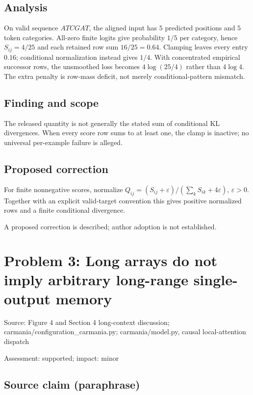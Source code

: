 \documentclass[11pt]{article}
\begin{document}
\subsection*{Analysis}

On valid sequence \(ATCGAT\), the aligned input has \(5\) predicted positions and \(5\) token categories. All-zero finite logits give probability \(1/5\) per category, hence \(S_{ij}=4/25\) and each retained row sum \(16/25=0.64\). Clamping leaves every entry \(0.16\); conditional normalization instead gives \(1/4\). With concentrated empirical successor rows, the unsmoothed loss becomes \(4\log(25/4)\) rather than \(4\log4\). The extra penalty is row-mass deficit, not merely conditional-pattern mismatch.

\subsection*{Finding and scope}

The released quantity is not generally the stated sum of conditional KL divergences. When every score row sums to at least one, the clamp is inactive; no universal per-example failure is alleged.

\subsection*{Proposed correction}

For finite nonnegative scores, normalize \(Q_{ij}=(S_{ij}+\varepsilon)/(\sum_kS_{ik}+4\varepsilon)\), \(\varepsilon>0\). Together with an explicit valid-target convention this gives positive normalized rows and a finite conditional divergence.

A proposed correction is described; author adoption is not established.

\section*{Problem 3: Long arrays do not imply arbitrary long-range single-output memory}

Source: Figure 4 and Section 4 long-context discussion; carmania/configuration\_carmania.py; carmania/model.py, causal local-attention dispatch

Assessment: supported; impact: minor

\subsection*{Source claim (paraphrase)}
\end{document}
